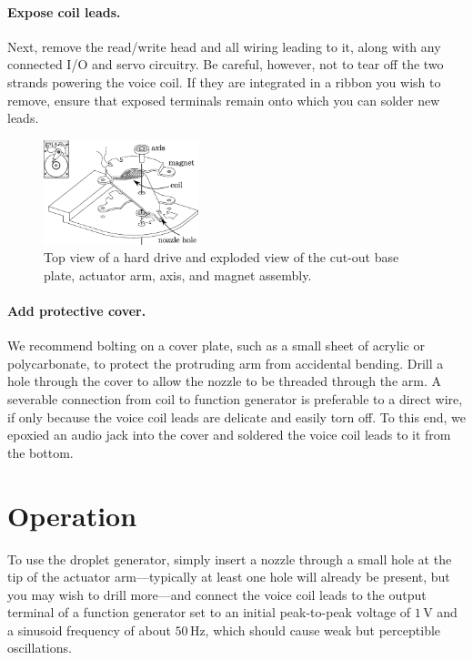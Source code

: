 \documentclass[aip,rsi,reprint,graphicx]{revtex4-1} %
\begin{document}
\paragraph{Expose coil leads.} Next, remove the read/write head and all
wiring leading to it, along with any connected I/O and servo circuitry. Be
careful, however, not to tear off the two strands powering the voice coil. If
they are integrated in a ribbon you wish to remove, ensure that exposed
terminals remain onto which you can solder new leads.
\begin{figure}
\centering
\includegraphics[width=0.4\textwidth]{hdg_images/dge.eps}
\caption{Top view of a hard drive and exploded view of the cut-out base
plate, actuator arm, axis, and magnet assembly. \label{fig:designschematic}}
\end{figure}
\paragraph{Add protective cover.} We recommend bolting on a cover plate, such
as a small sheet of acrylic or polycarbonate, to protect the protruding arm from
accidental bending. Drill a hole through the cover to allow the nozzle to be
threaded through the arm. A severable
connection from coil to function generator is preferable to a direct wire, if
only because the voice coil leads are delicate and easily torn off. To this end, we epoxied
an audio jack into the cover and soldered the voice coil leads to it from the
bottom. 

\section{Operation}
To use the droplet generator, simply insert a nozzle through a small hole at the
tip of the actuator arm---typically at least one hole will already be present, but you may wish to drill
more---and connect the voice coil leads to the output terminal of a function
generator set to an initial peak-to-peak voltage of $1\,$V and a sinusoid frequency of
about $50\,$Hz, which should cause weak but perceptible oscillations.
\end{document}

